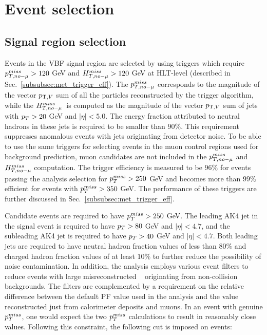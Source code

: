 \section{Event selection}
\label{sec:event_selection}

\newcommand\plotDir{DataMC/merged_2023-04-08_vbfhinv_full_analysis}

\subsection{Signal region selection}
\label{subsec:sr_vbf_selection}

Events in the VBF signal region are selected by using triggers which require
$p_{T,no-\mu}^{miss} > 120$ GeV and $H_{T,no-\mu}^{miss} > 120$ GeV at HLT-level (described in Sec.~\ref{subsubsec:met_trigger_eff}). 
The $p_{T,no-\mu}^{miss}$ corresponds to the magnitude of the vector $p_{\mathrm{T},V}$ 
sum of all the particles reconstructed by the trigger algorithm, 
while the $H_{T,no-\mu}^{miss}$~is computed as the magnitude of the vector $p_{\mathrm{T},V}$ sum of jets with $p_T > 20$ GeV and $|\eta| < 5.0$. 
The energy fraction attributed to neutral hadrons in these jets is required to be smaller than $90\%$. 
This requirement suppresses anomalous events with jets originating from detector noise. 
To be able to use the same triggers for selecting events in the muon control regions used for background prediction, 
muon candidates are not included in the $p_{T,no-\mu}^{miss}$ and $H_{T,no-\mu}^{miss}$ computation. 
The trigger efficiency is measured to be $96\%$ for events passing the analysis selection for $p_T^{miss} > 250$ GeV and 
becomes more than $99\%$ efficient for events with $p_T^{miss} > 350$ GeV. 
The performance of these triggers are further discussed in Sec.~\ref{subsubsec:met_trigger_eff}.

Candidate events are required to have $p_T^{miss} > 250$ GeV. 
The leading AK4 jet in the signal event is required to have $p_T > 80$ GeV and $|\eta| < 4.7$, and the subleading AK4 jet is 
required to have $p_T > 40$ GeV and $|\eta| < 4.7$.
Both leading jets are required to have neutral hadron fraction values of less than $80\%$ and charged hadron fraction 
values of at least $10\%$ to further reduce the possibility of noise contamination. In addition, the analysis employs 
various event filters to reduce events with large misreconstructed \ptmiss~\cite{Sirunyan:2019kia} originating from 
non-collision backgrounds. The filters are complemented by a requirement on the relative difference between the default 
PF \ptmiss value used in the analysis and the \ptmiss value reconstructed just from calorimeter deposits and muons. 
In an event with genuine $p_T^{miss}$, one would expect the two $p_T^{miss}$ calculations to result in reasonably close values.
Following this constraint, the following cut is imposed on events:

